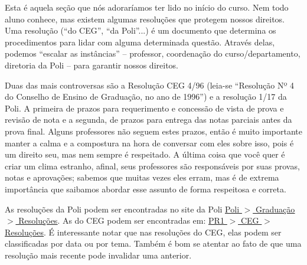 	Esta é aquela seção que nós adoraríamos ter lido no início do curso. Nem todo aluno conhece, mas existem algumas resoluções que protegem nossos direitos.
    Uma resolução (``do CEG'', ``da Poli''...) é um documento que determina os procedimentos para lidar com alguma determinada questão.
    Através delas, podemos ``escalar as instâncias'' -- professor, coordenação do curso/departamento, diretoria da Poli -- para garantir nossos direitos.
    
    Duas das mais controversas são a Resolução CEG 4/96 (leia-se ``Resolução Nº 4 do Conselho de Ensino de Graduação, no ano de 1996'') e a resolução 1/17 da Poli. A primeira de prazos para requerimento e concessão de vista de prova e revisão de nota e a segunda, de prazos para entrega das notas parciais antes da prova final.
    Alguns professores não seguem estes prazos, então é muito importante manter a calma e a compostura na hora de conversar com eles sobre isso, pois é um direito seu, mas nem sempre é respeitado. A última coisa que você quer é criar um clima estranho, afinal, seus professores são responsáveis por suas provas, notas e aprovações; sabemos que muitas vezes eles erram, mas é de extrema importância que saibamos abordar esse assunto de forma respeitosa e correta.
    
    As resoluções da Poli podem ser encontradas no site da Poli \underline{\href{http://www.poli.ufrj.br/resolucoes.php}{Poli $>$ Graduação $>$ Resoluções}}.
    As do CEG podem ser encontradas em: \underline{\href{https://xn--graduao-2wa9a.ufrj.br/index.php/469-ceg-resolues}{PR1 $>$ CEG $>$ Resoluções}}. É interessante notar que nas resoluções do CEG, elas podem ser classificadas por data ou por tema.
    Também é bom se atentar ao fato de que uma resolução mais recente pode invalidar uma anterior.
